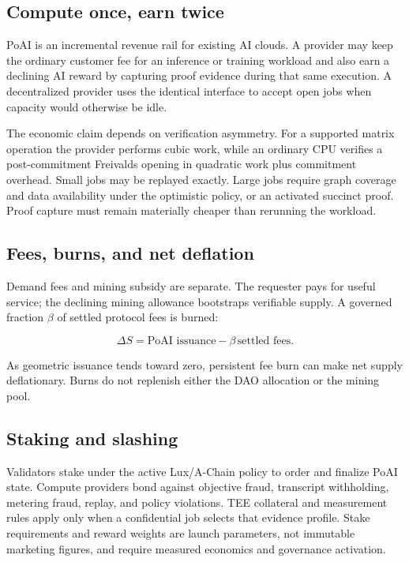 \subsection{Compute once, earn twice}

PoAI is an incremental revenue rail for existing AI clouds. A provider may keep
the ordinary customer fee for an inference or training workload and also earn a
declining AI reward by capturing proof evidence during that same execution. A
decentralized provider uses the identical interface to accept open jobs when
capacity would otherwise be idle.

The economic claim depends on verification asymmetry. For a supported matrix
operation the provider performs cubic work, while an ordinary CPU verifies a
post-commitment Freivalds opening in quadratic work plus commitment overhead.
Small jobs may be replayed exactly. Large jobs require graph coverage and data
availability under the optimistic policy, or an activated succinct proof.
Proof capture must remain materially cheaper than rerunning the workload.

\subsection{Fees, burns, and net deflation}

Demand fees and mining subsidy are separate. The requester pays for useful
service; the declining mining allowance bootstraps verifiable supply. A governed
fraction $\beta$ of settled protocol fees is burned:

\begin{equation}
  \Delta S = \text{PoAI issuance} - \beta\,\text{settled fees}.
\end{equation}

As geometric issuance tends toward zero, persistent fee burn can make net supply
deflationary. Burns do not replenish either the DAO allocation or the mining
pool.

\subsection{Staking and slashing}

Validators stake under the active Lux/A-Chain policy to order and finalize PoAI
state. Compute providers bond against objective fraud, transcript withholding,
metering fraud, replay, and policy violations. TEE collateral and measurement
rules apply only when a confidential job selects that evidence profile. Stake
requirements and reward weights are launch parameters, not immutable marketing
figures, and require measured economics and governance activation.
